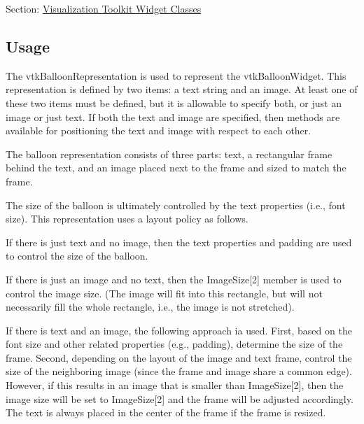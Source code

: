 Section\-: \hyperlink{sec_vtkwidgets}{Visualization Toolkit Widget Classes} \hypertarget{vtkwidgets_vtkxyplotwidget_Usage}{}\subsection{Usage}\label{vtkwidgets_vtkxyplotwidget_Usage}
The vtk\-Balloon\-Representation is used to represent the vtk\-Balloon\-Widget. This representation is defined by two items\-: a text string and an image. At least one of these two items must be defined, but it is allowable to specify both, or just an image or just text. If both the text and image are specified, then methods are available for positioning the text and image with respect to each other.

The balloon representation consists of three parts\-: text, a rectangular frame behind the text, and an image placed next to the frame and sized to match the frame.

The size of the balloon is ultimately controlled by the text properties (i.\-e., font size). This representation uses a layout policy as follows.

If there is just text and no image, then the text properties and padding are used to control the size of the balloon.

If there is just an image and no text, then the Image\-Size\mbox{[}2\mbox{]} member is used to control the image size. (The image will fit into this rectangle, but will not necessarily fill the whole rectangle, i.\-e., the image is not stretched).

If there is text and an image, the following approach ia used. First, based on the font size and other related properties (e.\-g., padding), determine the size of the frame. Second, depending on the layout of the image and text frame, control the size of the neighboring image (since the frame and image share a common edge). However, if this results in an image that is smaller than Image\-Size\mbox{[}2\mbox{]}, then the image size will be set to Image\-Size\mbox{[}2\mbox{]} and the frame will be adjusted accordingly. The text is always placed in the center of the frame if the frame is resized.

